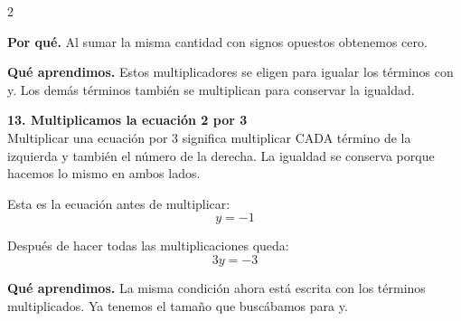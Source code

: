 \documentclass[11pt,a4paper,landscape]{article}
\begin{document}
\begin{multicols*}{2}
\begin{minipage}{\linewidth}
\par\smallskip\textbf{Por qué.} Al sumar la misma cantidad con signos opuestos obtenemos cero.
\par{}\par\smallskip
\par\smallskip\textbf{Qué aprendimos.} Estos multiplicadores se eligen para igualar los términos con y. Los demás términos también se multiplican para conservar la igualdad.
\end{minipage}\par\medskip
\noindent\begin{minipage}{\linewidth}\textbf{13. Multiplicamos la ecuación 2 por 3}\\[2pt]Multiplicar una ecuación por 3 significa multiplicar CADA término de la izquierda y también el número de la derecha. La igualdad se conserva porque hacemos lo mismo en ambos lados.
\par\smallskip Esta es la ecuación antes de multiplicar:
\[y = -1\]
\par{}\par\smallskip
\par\smallskip Después de hacer todas las multiplicaciones queda:
\[3y = -3\]
\par\smallskip\textbf{Qué aprendimos.} La misma condición ahora está escrita con los términos multiplicados. Ya tenemos el tamaño que buscábamos para y.

\end{minipage}
\end{multicols*}
\end{document}
